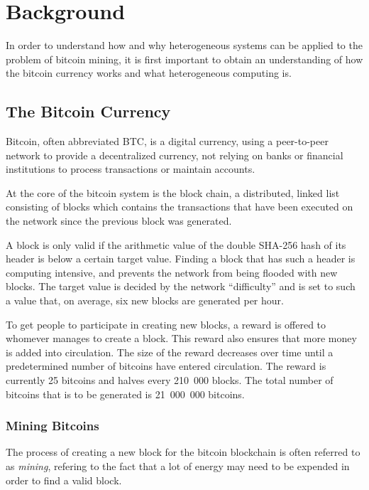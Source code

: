 \chapter{Background}
\label{cha:background}

In order to understand how and why heterogeneous systems can be applied to the problem of
bitcoin mining, it is first important to obtain an understanding of how the bitcoin currency
works and what heterogeneous computing is.

\section{The Bitcoin Currency}
\label{sec:bitcoins}

Bitcoin, often abbreviated BTC, is a digital currency, using a peer-to-peer network to provide
a decentralized currency, not relying on banks or financial institutions to process transactions
or maintain accounts.

At the core of the bitcoin system is the block chain, a distributed, linked list consisting of blocks
which contains the transactions that have been executed on the network since the previous block was
generated.

A block is only valid if the arithmetic value of the double SHA-256 hash of its header is below
a certain target value. Finding a block that has such a header is computing intensive, and prevents
the network from being flooded with new blocks. The target value is decided by the network ``difficulty''
and is set to such a value that, on average, six new blocks are generated per hour.

To get people to participate in creating new blocks, a reward is offered to whomever manages to
create a block. This reward also ensures that more money is added into circulation. The size of
the reward decreases over time until a predetermined number of bitcoins have entered circulation.
The reward is currently 25 bitcoins and halves every 210~000 blocks. The total number of bitcoins
that is to be generated is 21~000~000 bitcoins. \cite{bitcoin}

\subsection{Mining Bitcoins}
\label{sec:bitcoin-mining}

The process of creating a new block for the bitcoin blockchain is often referred to as \textit{mining},
refering to the fact that a lot of energy may need to be expended in order to find a valid block.

